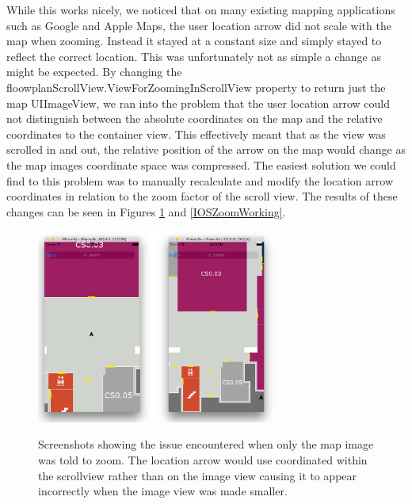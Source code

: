\documentclass[12pt,a4paper]{report}
\begin{document}
While this works nicely, we noticed that on many existing mapping applications such as Google and Apple Maps, the user location arrow did not scale with the map when zooming. Instead it stayed at a constant size and simply stayed to reflect the correct location. This was unfortunately not as simple a change as might be expected. By changing the floowplanScrollView.ViewForZoomingInScrollView property to return just the map UIImageView, we ran into the problem that the user location arrow could not distinguish between the absolute coordinates on the map and the relative coordinates to the container view. This effectively meant that as the view was scrolled in and out, the relative position of the arrow on the map would change as the map images coordinate space was compressed. The easiest solution we could find to this problem was to manually recalculate and modify the location arrow coordinates in relation to the zoom factor of the scroll view. The results of these changes can be seen in Figures \ref{IOSZoomNotWorking} and \ref{IOSZoomWorking}.


\begin{figure}[]
\centering
\includegraphics[width=0.7\textwidth]{images-implementation/iOSZoomNotWorking.png}
\label{IOSZoomNotWorking}
\caption{Screenshots showing the issue encountered when only the map image was told to zoom. The location arrow would use coordinated within the scrollview rather than on the image view causing it to appear incorrectly when the image view was made smaller.}
\end{figure}
\end{document}
